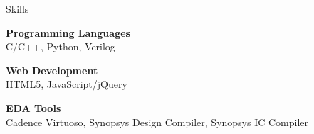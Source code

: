 
\begin{rSection}{Skills}

{\bf Programming Languages} \\
C/C++, Python, Verilog 

{\bf Web Development} \\
HTML5, JavaScript/jQuery 

{\bf EDA Tools} \\
Cadence Virtuoso, Synopsys Design Compiler, Synopsys IC Compiler 

\end{rSection}
